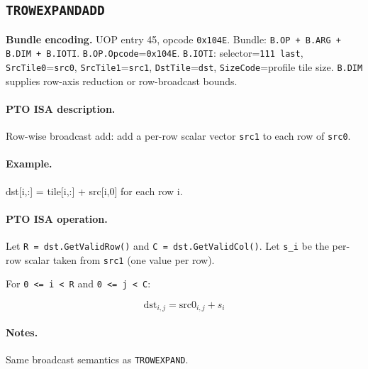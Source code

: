 \subsection{\texttt{TROWEXPANDADD}}
\noindent\textbf{Bundle encoding.} UOP entry 45, opcode \texttt{0x104E}. Bundle: \texttt{B.OP + B.ARG + B.DIM + B.IOTI}. \texttt{B.OP.Opcode}=\texttt{0x104E}. \texttt{B.IOTI}: selector=\texttt{111 last}, \texttt{SrcTile0}=\texttt{src0}, \texttt{SrcTile1}=\texttt{src1}, \texttt{DstTile}=\texttt{dst}, \texttt{SizeCode}=profile tile size. \texttt{B.DIM} supplies row-axis reduction or row-broadcast bounds.\par\smallskip
{\small
\paragraph{PTO ISA description.}
Row-wise broadcast add: add a per-row scalar vector \texttt{src1} to each row of \texttt{src0}.
\paragraph{Example.}
dst[i,:] = tile[i,:] + src[i,0] for each row i.
\par\smallskip
\paragraph{PTO ISA operation.}
Let \texttt{R = dst.GetValidRow()} and \texttt{C = dst.GetValidCol()}. Let \texttt{s\_i} be the per-row scalar taken from \texttt{src1} (one value per row).

For \texttt{0 \textless{}= i \textless{} R} and \texttt{0 \textless{}= j \textless{} C}:

\[
\mathrm{dst}_{i,j} = \mathrm{src0}_{i,j} + s_i
\]
}\par\smallskip
\paragraph{Notes.}
Same broadcast semantics as \texttt{TROWEXPAND}.
